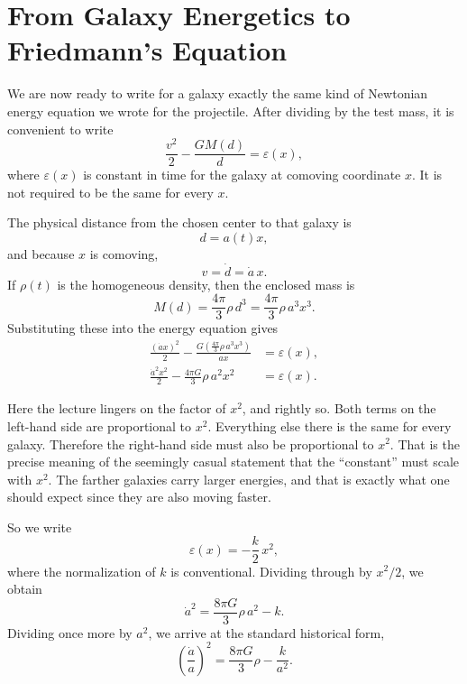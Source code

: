 \section{From Galaxy Energetics to Friedmann's Equation}

We are now ready to write for a galaxy exactly the same kind of Newtonian energy equation we wrote for the projectile. After dividing by the test mass, it is convenient to write
\begin{equation}
\frac{v^2}{2}-\frac{GM(d)}{d}=\varepsilon(x),
\end{equation}
where \(\varepsilon(x)\) is constant in time for the galaxy at comoving coordinate \(x\). It is not required to be the same for every \(x\).

The physical distance from the chosen center to that galaxy is
\begin{equation}
d=a(t)x,
\end{equation}
and because \(x\) is comoving,
\begin{equation}
v=\dot d=\dot a\,x.
\end{equation}
If \(\rho(t)\) is the homogeneous density, then the enclosed mass is
\begin{equation}
M(d)=\frac{4\pi}{3}\rho\,d^3=\frac{4\pi}{3}\rho\,a^3x^3.
\end{equation}
Substituting these into the energy equation gives
\begin{align}
\frac{(\dot a x)^2}{2}-\frac{G\left(\frac{4\pi}{3}\rho\,a^3x^3\right)}{ax} &= \varepsilon(x), \\
\frac{\dot a^2x^2}{2}-\frac{4\pi G}{3}\rho\,a^2x^2 &= \varepsilon(x).
\end{align}

Here the lecture lingers on the factor of \(x^2\), and rightly so. Both terms on the left-hand side are proportional to \(x^2\). Everything else there is the same for every galaxy. Therefore the right-hand side must also be proportional to \(x^2\). That is the precise meaning of the seemingly casual statement that the ``constant'' must scale with \(x^2\). The farther galaxies carry larger energies, and that is exactly what one should expect since they are also moving faster.

So we write
\begin{equation}
\varepsilon(x)=-\frac{k}{2}\,x^2,
\end{equation}
where the normalization of \(k\) is conventional. Dividing through by \(x^2/2\), we obtain
\begin{equation}
\dot a^2=\frac{8\pi G}{3}\rho\,a^2-k.
\end{equation}
Dividing once more by \(a^2\), we arrive at the standard historical form,
\begin{equation}
\left(\frac{\dot a}{a}\right)^2=\frac{8\pi G}{3}\rho-\frac{k}{a^2}.
\end{equation}


